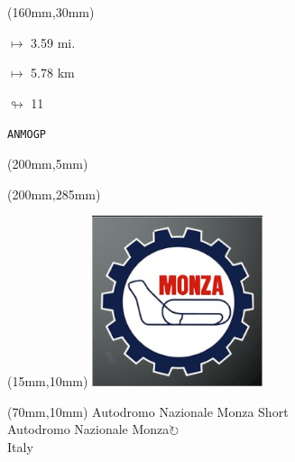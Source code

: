 \begin{textblock*}{40mm}(160mm,30mm)%
\Large
\par$\mapsto$ 3.59 mi.
\par$\mapsto$ 5.78 km
\par$\looparrowright$ 11
\par\hfill\tiny\tt ANMOGP\\
\end{textblock*}
\begin{textblock*}{20mm}(200mm,5mm)%
\fbox{\thepage}
\label{ANMOGP}
\end{textblock*}
\begin{textblock*}{20mm}(200mm,285mm)%
\fbox{\thepage}
\end{textblock*}

\null\newpage
\begin{textblock*}{50mm}(15mm,10mm)%
\includegraphics[width=50mm]{LG/2015-05-20_00086.png}
\end{textblock*}
\begin{textblock*}{130mm}(70mm,10mm)%
{\fontsize{20}{20}\selectfont Autodromo Nazionale Monza Short\\}
{\fontsize{16}{16}\selectfont Autodromo Nazionale Monza\hfill \Large$\circlearrowright$\\}
{\fontsize{12}{12}\selectfont Italy\\}
\end{textblock*}
